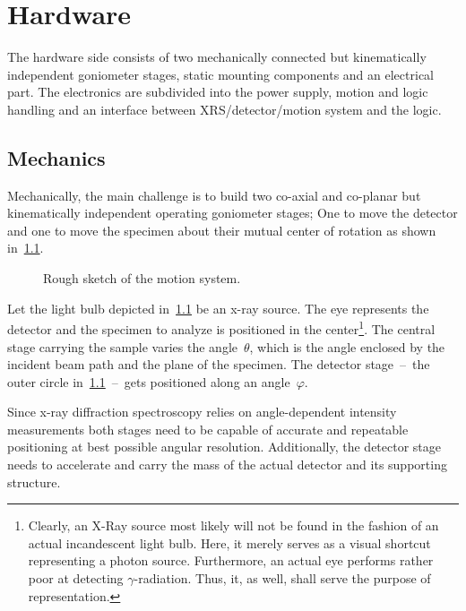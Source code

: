 \chapter{Hardware}\label{chap:hardware}
    The hardware side consists of two mechanically connected but kinematically independent goniometer stages, static mounting components and an electrical part.
    The electronics are subdivided into the power supply, motion and logic handling and an interface between XRS/detector/motion system and the logic.

    \section{Mechanics}\label{sec:mechanics}
        Mechanically, the main challenge is to build two co-axial and co-planar but kinematically independent operating goniometer stages;
        One to move the detector and one to move the specimen about their mutual center of rotation as shown in~\cref{fig:rough sketch of the motion system}.
        \begin{figure}[!h]
            \centering
            \caption[Rough sketch of the motion system]{Rough sketch of the motion system.}%
            \label{fig:rough sketch of the motion system}%
        \end{figure}
        Let the light bulb depicted in~\cref{fig:rough sketch of the motion system} be an x-ray source.
        The eye represents the detector and the specimen to analyze is positioned in the center\footnote{Clearly, an X-Ray source most likely will not be found in the fashion of an actual incandescent light bulb. Here, it merely serves as a visual shortcut representing a photon source. Furthermore, an actual eye performs rather poor at detecting \(\gamma\)-radiation. Thus, it, as well, shall serve the purpose of representation.}.
        The central stage carrying the sample varies the angle~\(\theta\), which is the angle enclosed by the incident beam path and the plane of the specimen.
        The detector stage~--~the outer circle in~\cref{fig:rough sketch of the motion system}~--~gets positioned along an angle~\(\varphi\).\par\medskip

        Since x-ray diffraction spectroscopy relies on angle-dependent intensity measurements both stages need to be capable of accurate and repeatable positioning at best possible angular resolution.
        Additionally, the detector stage needs to accelerate and carry the mass of the actual detector and its supporting structure.

